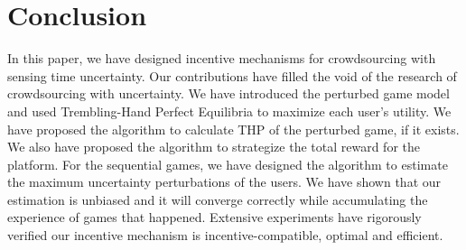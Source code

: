 \documentclass{IEEEtran}
\begin{document}
\section{Conclusion}
\label{sec:conclusion}
In this paper, we have designed incentive mechanisms for crowdsourcing with sensing time uncertainty. Our contributions have filled the void of the research of crowdsourcing with uncertainty. We have introduced the perturbed game model and used Trembling-Hand Perfect Equilibria to maximize each user's utility. We have proposed the algorithm to calculate THP of the perturbed game, if it exists. We also have proposed the algorithm to strategize the total reward for the platform. For the sequential games, we have designed the algorithm to estimate the maximum uncertainty perturbations of the users. We have shown that our estimation is unbiased and it will converge correctly while accumulating the experience of games that happened. Extensive experiments have rigorously verified our incentive mechanism is incentive-compatible, optimal and efficient.




\appendix
\end{document}
